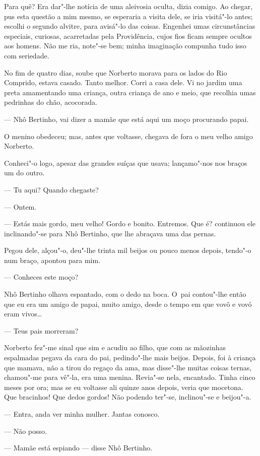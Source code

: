 \begin{linenumbers}
Para quê? Era dar"-lhe notícia de uma aleivosia oculta, dizia comigo. Ao
chegar, pus esta questão a mim mesmo, se esperaria a visita dele, se
iria visitá"-lo antes; escolhi o segundo alvitre, para avisá"-lo das
coisas. Engenhei umas circunstâncias especiais, curiosas, acarretadas
pela Providência, cujos fios ficam sempre ocultos aos homens. Não me
ria, note"-se bem; minha imaginação compunha tudo isso com seriedade.

No fim de quatro dias, soube que Norberto morava para os lados do Rio
Comprido, estava casado. Tanto melhor. Corri a casa dele. Vi no jardim
uma preta amamentando uma criança, outra criança de ano e meio, que
recolhia umas pedrinhas do chão, acocorada.

--- Nhô Bertinho, vai dizer a mamãe que está aqui um moço procurando
papai.

O menino obedeceu; mas, antes que voltasse, chegava de fora o meu velho
amigo Norberto.

Conheci"-o logo, apesar das grandes suíças que usava; lançamo"-nos nos
braços um do outro.

--- Tu aqui? Quando chegaste?

--- Ontem.

--- Estás mais gordo, meu velho! Gordo e bonito. Entremos. Que é?
continuou ele inclinando"-se para Nhô Bertinho, que lhe abraçava uma das
pernas.

Pegou dele, alçou"-o, deu"-lhe trinta mil beijos ou pouco menos depois,
tendo"-o num braço, apontou para mim.

--- Conheces este moço?

Nhô Bertinho olhava espantado, com o dedo na boca. O~pai contou"-lhe
então que eu era um amigo de papai, muito amigo, desde o tempo em que
vovô e vovó eram vivos\ldots{}

--- Teus pais morreram?

Norberto fez"-me sinal que sim e acudiu ao filho, que com as mãozinhas
espalmadas pegava da cara do pai, pedindo"-lhe mais beijos. Depois, foi à
criança que mamava, não a tirou do regaço da ama, mas disse"-lhe muitas
coisas ternas, chamou"-me para vê"-la, era uma menina. Revia"-se nela,
encantado. Tinha cinco meses por ora; mas se eu voltasse ali quinze anos
depois, veria que mocetona. Que bracinhos! Que dedos gordos! Não podendo
ter"-se, inclinou"-se e beijou"-a.

--- Entra, anda ver minha mulher. Jantas conosco.

--- Não posso.

--- Mamãe está espiando --- disse Nhô Bertinho.


\end{linenumbers}
